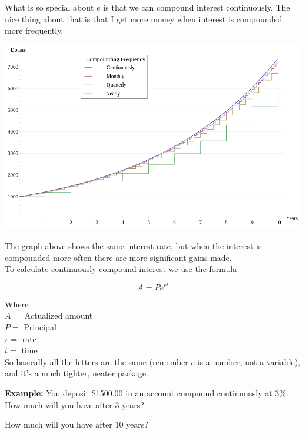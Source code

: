 \documentclass[12pt]{article}
\begin{document}
What is so special about $e$ is that we can compound interest continuously. The nice thing about that is that I get more money when interest is compounded more frequently.\\

\begin{center}
\includegraphics[scale=.5]{compoundinterest.png}
\end{center}

The graph above shows the same interest rate, but when the interest is compounded more often there are more significant gains made. \\

To calculate continuously compound interest we use the formula 

$$A=Pe^{rt}$$

Where\\
$A=$ Actualized amount\\
$P=$ Principal\\
$r=$ rate\\
$t=$ time\\

So basically all the letters are the same (remember $e$ is a number, not a variable), and it's a much tighter, neater package.\\

\pagebreak

\textbf{Example:} You deposit \$1500.00 in an account compound continuously at 3\%. How much will you have after 3 years?

\vspace{1in}

How much will you have after 10 years?\\

\vspace{1in}
\end{document}
